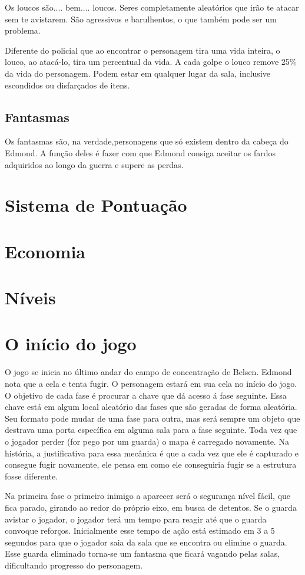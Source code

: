 \documentclass[12pt]{article}
\begin{document}
Os loucos são.... bem.... loucos. Seres completamente aleatórios que irão te atacar sem te avistarem. São agressivos e barulhentos, o que também pode ser um problema. 

Diferente do policial que ao encontrar o personagem tira uma vida inteira, o louco, ao atacá-lo, tira um percentual da vida. A cada golpe o louco remove 25\% da vida do personagem. Podem estar em qualquer lugar da sala, inclusive escondidos ou disfarçados de itens.

\subsection{Fantasmas}

Os fantasmas são, na verdade,personagens que só existem dentro da cabeça do Edmond. A função deles é fazer com que Edmond consiga aceitar os fardos adquiridos ao longo da guerra e supere as perdas.

\section{Sistema de Pontuação}
\section{Economia}
\section{Níveis}

\section{O início do jogo}
    O jogo se inicia no último andar do campo de concentração de Belsen. Edmond nota que a cela e tenta fugir. O personagem estará em sua cela no início do jogo. O objetivo de cada fase é procurar a chave que dá acesso á fase seguinte. Essa chave está em algum local aleatório das fases que são geradas de forma aleatória. Seu formato pode mudar de uma fase para outra, mas será sempre um objeto que destrava uma porta específica em alguma sala para a fase seguinte. Toda vez que o jogador perder (for pego por um guarda) o mapa é carregado novamente. Na história, a justificativa para essa mecânica é que a cada vez que ele é capturado e consegue fugir novamente, ele pensa em como ele conseguiria fugir se a estrutura fosse diferente.
  
    Na primeira fase o primeiro inimigo a aparecer será o segurança nível fácil, que fica parado, girando ao redor do próprio eixo, em busca de detentos. Se o guarda avistar o jogador, o jogador terá um tempo para reagir até que o guarda convoque reforços. Inicialmente esse tempo de ação está estimado em 3 a 5 segundos para que o jogador saia da sala que se encontra ou elimine o guarda. Esse guarda eliminado torna-se um fantasma que ficará vagando pelas salas, dificultando progresso do personagem.
  
\end{document}
